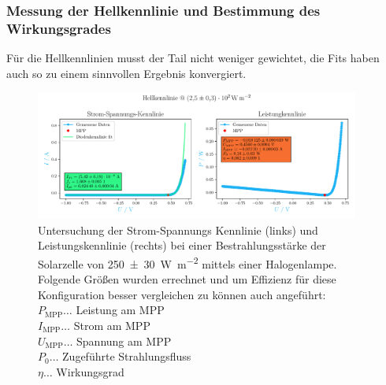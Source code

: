 \documentclass[12pt,english,ngerman]{scrartcl}
\begin{document}
\subsubsection{Messung der Hellkennlinie und Bestimmung des Wirkungsgrades}

Für die Hellkennlinien musst der Tail nicht weniger gewichtet, die Fits haben
auch so zu einem sinnvollen Ergebnis konvergiert.

\begin{figure}[H]
	\centering
	\includegraphics[width=0.95\textwidth]{figures/helllampe.pdf}
	\caption{Untersuchung der Strom-Spannungs Kennlinie
		(links) und Leistungskennlinie (rechts) bei einer
		Bestrahlungsstärke der Solarzelle von \SI{250(30)}{\watt\per\meter\squared}
		mittels einer Halogenlampe.
		Folgende Größen wurden errechnet und um Effizienz für diese Konfiguration
		besser vergleichen zu können auch angeführt: \\
		$P_\text{MPP} \dots$ Leistung am MPP         \\
		$I_\text{MPP} \dots$ Strom am MPP            \\
		$U_\text{MPP} \dots$ Spannung am MPP         \\
		$P_0 \dots$ Zugeführte Strahlungsfluss       \\
		$\eta \dots$ Wirkungsgrad
	}\label{fig:ausw_kennlinie_hell_lampe}
\end{figure}
\end{document}
